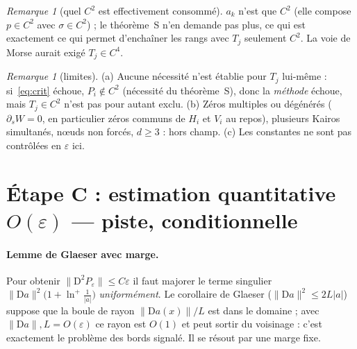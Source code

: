 \documentclass[11pt,a4paper]{article}
\theoremstyle{remark}
\newtheorem{remarque}[theoreme]{Remarque}
\newcommand{\D}{\mathrm D}
\begin{document}
\begin{remarque}[quel $C^2$ est effectivement consommé]
$a_k$ n'est que $C^2$ (elle compose $p\in C^2$ avec $\sigma\in C^2$) ; le théorème~S n'en demande pas plus, ce qui est exactement ce qui permet d'enchaîner les rangs avec $T_j$ seulement $C^2$. La voie de Morse aurait exigé $T_j\in C^4$.
\end{remarque}

\begin{remarque}[limites]
(a) Aucune nécessité n'est établie pour $T_j$ lui-même : si~\eqref{eq:crit} échoue, $P_i\notin C^2$ (nécessité du théorème~S), donc la \emph{méthode} échoue, mais $T_j\in C^2$ n'est pas pour autant exclu. (b) Zéros multiples ou dégénérés ($\partial_sW=0$, en particulier zéros communs de $H_i$ et $V_i$ au repos), plusieurs Kairos simultanés, nœuds non forcés, $d\ge3$ : hors champ. (c) Les constantes ne sont pas contrôlées en $\varepsilon$ ici.
\end{remarque}

\section{Étape C : estimation quantitative $O(\varepsilon)$ --- piste, conditionnelle}
\paragraph{Lemme de Glaeser avec marge.} Pour obtenir $\lVert\D^2P_\varepsilon\rVert\le C\varepsilon$ il faut majorer le terme singulier $\lVert\D a\rVert^2\bigl(1+\ln^+\tfrac1{\lvert a\rvert}\bigr)$ \emph{uniformément}. Le corollaire de Glaeser ($\lVert\D a\rVert^2\le2L\lvert a\rvert$) suppose que la boule de rayon $\lVert\D a(x)\rVert/L$ est dans le domaine ; avec $\lVert\D a\rVert,L=O(\varepsilon)$ ce rayon est $O(1)$ et peut sortir du voisinage : c'est exactement le problème des bords signalé. Il se résout par une marge fixe.
\end{document}

